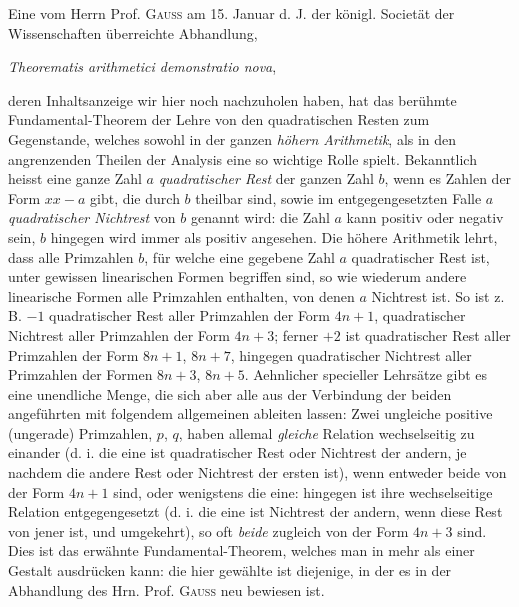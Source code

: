Eine vom Herrn Prof. \textsc{Gauss} am 15. Januar d. J. der königl. Societät der Wissenschaften überreichte Abhandlung,
\begin{center}\emph{Theorematis arithmetici demonstratio nova},\end{center}
deren Inhaltsanzeige wir hier noch nachzuholen haben, hat das berühmte Fundamental-Theorem der Lehre von den quadratischen Resten zum Gegenstande, welches sowohl in der ganzen \emph{höhern Arithmetik}, als in den angrenzenden Theilen der Analysis eine so wichtige Rolle spielt. Bekanntlich heisst eine ganze Zahl $a$ \emph{quadratischer Rest} der ganzen Zahl $b$, wenn es Zahlen der Form $xx-a$ gibt, die durch $b$ theilbar sind, sowie im entgegengesetzten Falle $a$ \emph{quadratischer Nichtrest} von $b$ genannt wird: die Zahl $a$ kann positiv oder negativ sein, $b$ hingegen wird immer als positiv angesehen. Die höhere Arithmetik lehrt, dass alle Primzahlen $b$, für welche eine gegebene Zahl $a$ quadratischer Rest ist, unter gewissen linearischen Formen begriffen sind, so wie wiederum andere linearische Formen alle Primzahlen enthalten, von denen $a$ Nichtrest ist. So ist z. B. $-1$ quadratischer Rest aller Primzahlen der Form $4n+1$, quadratischer Nichtrest aller Primzahlen der Form $4n+3$; ferner $+2$ ist quadratischer Rest aller Primzahlen der Form $8n+1$, $8n+7$, hingegen quadratischer Nichtrest aller Primzahlen der Formen $8n+3$, $8n+5$. Aehnlicher specieller Lehrsätze gibt es eine unendliche Menge, die sich aber alle aus der Verbindung der beiden angeführten
%
mit folgendem allgemeinen ableiten lassen: Zwei ungleiche positive (ungerade) Primzahlen, $p$, $q$, haben allemal \emph{gleiche} Relation wechselseitig zu einander (d. i. die eine ist quadratischer Rest oder Nichtrest der andern, je nachdem die andere Rest oder Nichtrest der ersten ist), wenn entweder beide von der Form $4n+1$ sind, oder wenigstens die eine: hingegen ist ihre wechselseitige Relation entgegengesetzt (d. i. die eine ist Nichtrest der andern, wenn diese Rest von jener ist, und umgekehrt), so oft \emph{beide} zugleich von der Form $4n+3$ sind. Dies ist das erwähnte Fundamental-Theorem, welches man in mehr als einer Gestalt ausdrücken kann: die hier gewählte ist diejenige, in der es in der Abhandlung des Hrn. Prof. \textsc{Gauss} neu bewiesen ist.


